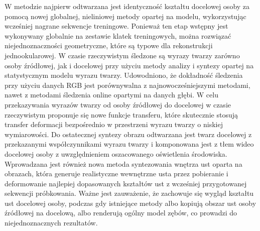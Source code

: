 W metodzie najpierw odtwarzana jest identyczność kształtu docelowej osoby za pomocą nowej globalnej, nieliniowej metody opartej na modelu, wykorzystując wcześniej nagrane sekwencje treningowe.
Ponieważ ten etap wstępny jest wykonywany globalnie na zestawie klatek treningowych, można rozwiązać niejednoznaczności geometryczne, które są typowe dla rekonstrukcji jednookularowej.
W czasie rzeczywistym śledzone są wyrazy twarzy zarówno osoby źródłowej, jak i docelowej przy użyciu metody analizy i syntezy opartej na statystycznym modelu wyrazu twarzy. Udowodniono, że dokładność śledzenia przy użyciu danych RGB jest porównywalna z najnowocześniejszymi metodami, nawet z metodami śledzenia online opartymi na danych głębi.
W celu przekazywania wyrazów twarzy od osoby źródłowej do docelowej w czasie rzeczywistym proponuje się nowe funkcje transferu, które skutecznie stosują transfer deformacji bezpośrednio w przestrzeni wyrazu twarzy o niskiej wymiarowości. Do ostatecznej syntezy obrazu odtwarzana jest twarz docelowej z przekazanymi współczynnikami wyrazu twarzy i komponowana jest z tłem wideo docelowej osoby z uwzględnieniem oszacowanego oświetlenia środowiska. Wprowadzana jest również nowa metoda syntezowania wnętrza ust oparta na obrazach, która generuje realistyczne wewnętrzne usta przez pobieranie i deformowanie najlepiej dopasowanych kształtów ust z wcześniej przygotowanej sekwencji próbkowania.
Ważne jest zauważenie, że zachowuje się wygląd kształtu ust docelowej osoby, podczas gdy istniejące metody albo kopiują obszar ust osoby źródłowej na docelową, albo renderują ogólny model zębów, co prowadzi do niejednoznacznych rezultatów.